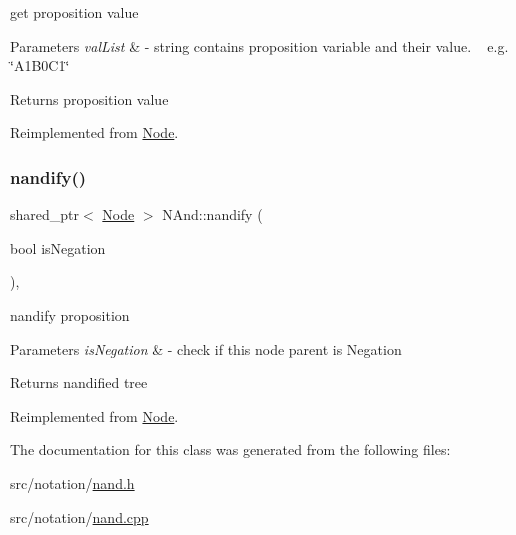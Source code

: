 get proposition value 


\begin{DoxyParams}{Parameters}
{\em val\+List} & -\/ string contains proposition variable and their value. ~\newline
 e.\+g. \char`\"{}\+A1\+B0\+C1\char`\"{} \\
\hline
\end{DoxyParams}
\begin{DoxyReturn}{Returns}
proposition value 
\end{DoxyReturn}


Reimplemented from \hyperlink{class_node_afd0c2045f3955e02e3aa1e2e987f10b2}{Node}.

\mbox{\label{class_n_and_ae60ecc244dd83bfdcc7eada4957890d8}} 
\subsubsection{\texorpdfstring{nandify()}{nandify()}}
{\footnotesize\ttfamily shared\+\_\+ptr$<$ \hyperlink{class_node}{Node} $>$ N\+And\+::nandify (\begin{DoxyParamCaption}\item[{bool}]{is\+Negation }\end{DoxyParamCaption})\hspace{0.3cm}{\ttfamily [override]}, {\ttfamily [virtual]}}



nandify proposition 


\begin{DoxyParams}{Parameters}
{\em is\+Negation} & -\/ check if this node parent is Negation \\
\hline
\end{DoxyParams}
\begin{DoxyReturn}{Returns}
nandified tree 
\end{DoxyReturn}


Reimplemented from \hyperlink{class_node_a3b2e192b59b7e72908af7903c5a4e5c1}{Node}.



The documentation for this class was generated from the following files\+:\begin{DoxyCompactItemize}
\item 
src/notation/\hyperlink{nand_8h}{nand.\+h}\item 
src/notation/\hyperlink{nand_8cpp}{nand.\+cpp}\end{DoxyCompactItemize}
